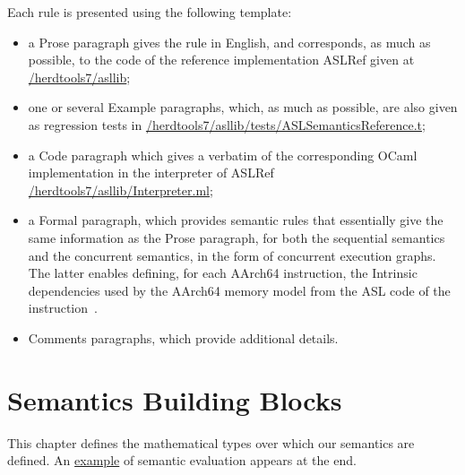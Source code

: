 \documentclass{book}
\begin{document}
Each rule is presented using the following template:
\begin{itemize}
\item a Prose paragraph gives the rule in English, and corresponds, as much as possible, to the code of the reference implementation ASLRef given at
 \href{https://github.com/herd/herdtools7//tree/master/asllib}{/herdtools7/asllib};

 \item one or several Example paragraphs, which, as much as possible, are also given as regression tests in
\href{https://github.com/herd/herdtools7//tree/master/asllib/tests/ASLSemanticsReference.t}{/herdtools7/asllib/tests/ASLSemanticsReference.t};

\ifcode
\item a Code paragraph which gives a verbatim of the corresponding OCaml implementation in the interpreter of ASLRef
\href{https://github.com/herd/herdtools7//tree/master/asllib/Interpreter.ml}{/herdtools7/asllib/Interpreter.ml};
\fi

\ifformal
\item a Formal paragraph, which provides semantic rules that essentially give the same information as the Prose paragraph, for both
the sequential semantics and the concurrent semantics, in the form of concurrent execution graphs.
The latter enables defining, for each AArch64 instruction,
the Intrinsic dependencies used by the AArch64 memory model from the ASL code of the instruction~\cite[B2.3.2]{ArmARM}.
\fi

\item Comments paragraphs, which provide additional details. %
\end{itemize}



\chapter{Semantics Building Blocks}
\label{chap:semanticsbuildingblocks}
This chapter defines the mathematical types over which our semantics are defined.
An \hyperlink{eval-example}{example} of semantic evaluation appears at the end.

\end{document}
